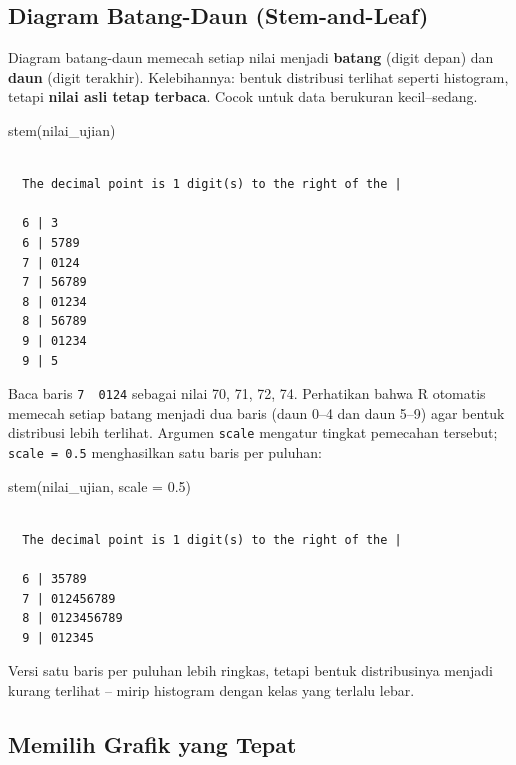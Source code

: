 \documentclass[
  indonesian,
  letterpaper,
]{book}
\newenvironment{Shaded}{\begin{snugshade}}{\end{snugshade}}
\newcommand{\AttributeTok}[1]{\textcolor[rgb]{0.40,0.45,0.13}{#1}}
\newcommand{\FloatTok}[1]{\textcolor[rgb]{0.68,0.00,0.00}{#1}}
\newcommand{\FunctionTok}[1]{\textcolor[rgb]{0.28,0.35,0.67}{#1}}
\newcommand{\NormalTok}[1]{\textcolor[rgb]{0.00,0.23,0.31}{#1}}
\begin{document}
\subsection{Diagram Batang-Daun
(Stem-and-Leaf)}\label{diagram-batang-daun-stem-and-leaf}

Diagram batang-daun memecah setiap nilai menjadi \textbf{batang} (digit
depan) dan \textbf{daun} (digit terakhir). Kelebihannya: bentuk
distribusi terlihat seperti histogram, tetapi \textbf{nilai asli tetap
terbaca}. Cocok untuk data berukuran kecil--sedang.

\begin{Shaded}
\begin{Highlighting}[]
\FunctionTok{stem}\NormalTok{(nilai\_ujian)}
\end{Highlighting}
\end{Shaded}

\begin{verbatim}

  The decimal point is 1 digit(s) to the right of the |

  6 | 3
  6 | 5789
  7 | 0124
  7 | 56789
  8 | 01234
  8 | 56789
  9 | 01234
  9 | 5
\end{verbatim}

Baca baris \texttt{7\ \textbar{}\ 0124} sebagai nilai 70, 71, 72, 74.
Perhatikan bahwa R otomatis memecah setiap batang menjadi dua baris
(daun 0--4 dan daun 5--9) agar bentuk distribusi lebih terlihat. Argumen
\texttt{scale} mengatur tingkat pemecahan tersebut;
\texttt{scale\ =\ 0.5} menghasilkan satu baris per puluhan:

\begin{Shaded}
\begin{Highlighting}[]
\FunctionTok{stem}\NormalTok{(nilai\_ujian, }\AttributeTok{scale =} \FloatTok{0.5}\NormalTok{)}
\end{Highlighting}
\end{Shaded}

\begin{verbatim}

  The decimal point is 1 digit(s) to the right of the |

  6 | 35789
  7 | 012456789
  8 | 0123456789
  9 | 012345
\end{verbatim}

Versi satu baris per puluhan lebih ringkas, tetapi bentuk distribusinya
menjadi kurang terlihat -- mirip histogram dengan kelas yang terlalu
lebar.

\subsection{Memilih Grafik yang Tepat}\label{memilih-grafik-yang-tepat}
\end{document}
